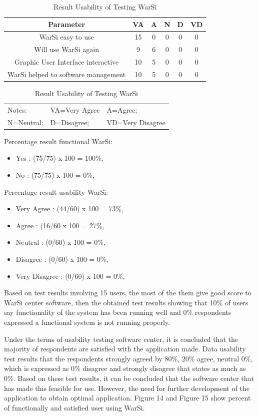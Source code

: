 \documentclass[conference, letterpaper]{IEEEtran}
\begin{document}
\begin{table}[!t]
\renewcommand{\arraystretch}{1.3}
\caption{Result Usability of Testing WarSi}
\label{table_usability}
\centering
\begin{tabular}{|c|c|c|c|c|c|}
\hline
\textbf{Parameter} & \textbf{VA} & \textbf{A} & \textbf{N} & \textbf{D} & \textbf{VD}\\
\hline
WarSi easy to use & 15 & 0 & 0 & 0 & 0\\
\hline
Will use WarSi again & 9 & 6 & 0 & 0 & 0\\
\hline
Graphic User Interface interactive & 10 & 5 & 0 & 0 & 0\\
\hline
WarSi helped to software management & 10 & 5 & 0 & 0 & 0\\
\hline
\end{tabular}
\begin{tabular}{lll}
Notes: &VA=Very Agree& A=Agree;\\
N=Neutral; &D=Disagree; &VD=Very Disagree\\
\end{tabular}
\end{table}

Percentage result functional WarSi:
\begin{itemize}
\item Yes : (75/75) x 100 = 100\%,
\item No : (75/75) x 100 = 0\%,
\end{itemize}

Percentage result usability WarSi:
\begin{itemize}
\item Very Agree : (44/60) x 100 = 73\%,
\item Agree : (16/60 x 100 = 27\%,
\item Neutral : (0/60) x 100 = 0\%,
\item Disagree : (0/60) x 100 = 0\%,
\item Very Disagree : (0/60) x 100 = 0\%,
\end{itemize}

Based on test results involving 15 users, the most of the them give good score to WarSi center software, then the obtained test results showing that 10\% of users say functionality of the system has been running well and 0\% respondents expressed a functional system is not running properly. 

Under the terms of usability testing software center, it is concluded that the majority of respondents are satisfied with the application made. Data usability test results that the respondents strongly agreed by 80\%, 20\% agree, neutral 0\%, which is expressed as 0\% disagree and strongly disagree that states as much as 0\%. Based on these test results, it can be concluded that the software center that has made this feasible for use. However, the need for further development of the application to obtain optimal application. Figure 14 and Figure 15 show percent of functionally and satisfied user using WarSi.
\end{document}
